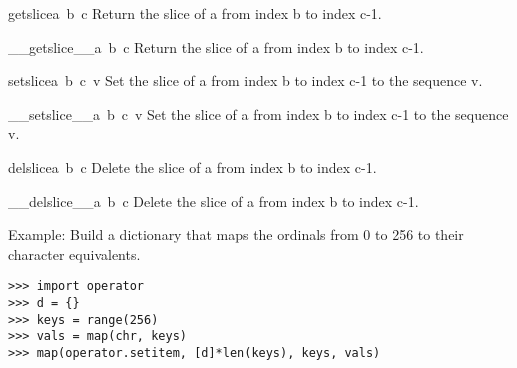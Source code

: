 \begin{funcdesc}{getslice}{a\, b\, c}
Return the slice of a from index b to index c-1.
\end{funcdesc}

\begin{funcdesc}{\_\_getslice\_\_}{a\, b\, c}
Return the slice of a from index b to index c-1.
\end{funcdesc}

\begin{funcdesc}{setslice}{a\, b\, c\, v}
Set the slice of a from index b to index c-1 to the sequence v.
\end{funcdesc}

\begin{funcdesc}{\_\_setslice\_\_}{a\, b\, c\, v}
Set the slice of a from index b to index c-1 to the sequence v.
\end{funcdesc}

\begin{funcdesc}{delslice}{a\, b\, c}
Delete the slice of a from index b to index c-1.
\end{funcdesc}

\begin{funcdesc}{\_\_delslice\_\_}{a\, b\, c}
Delete the slice of a from index b to index c-1.
\end{funcdesc}

Example: Build a dictionary that maps the ordinals from 0 to 256 to their
character equivalents.

\bcode\begin{verbatim}
>>> import operator
>>> d = {}
>>> keys = range(256)
>>> vals = map(chr, keys)
>>> map(operator.setitem, [d]*len(keys), keys, vals)
\end{verbatim}\ecode
